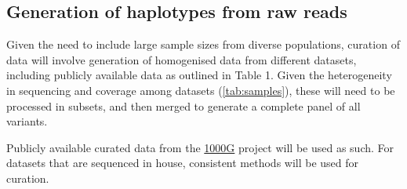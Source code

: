 \subsection{Generation of haplotypes from raw reads}
\label{sec:curation}
Given the need to include large sample sizes from diverse populations, curation of data will involve generation of homogenised data from different datasets, including publicly available data as outlined in Table 1. Given the heterogeneity in sequencing and coverage among datasets (\ref{tab:samples}), these will need to be processed in subsets, and then merged to generate a complete panel of all variants.

Publicly available curated data from the \href{http://www.1000genomes.org}{\gls{1000G}} project
will be used as such. For datasets that are sequenced in house, consistent methods will be used for curation.
















